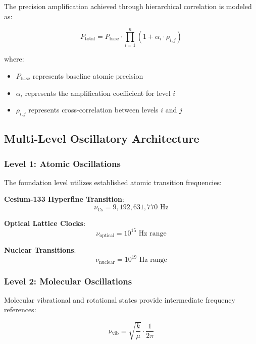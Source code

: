 \documentclass[12pt,a4paper]{article}
\begin{document}
{{{{{{{{{{{{{{The precision amplification achieved through hierarchical correlation is modeled as:

\begin{equation}
P_{\text{total}} = P_{\text{base}} \cdot \prod_{i=1}^{n} (1 + \alpha_i \cdot \rho_{i,j})
\end{equation}

where:
\begin{itemize}
\item $P_{\text{base}}$ represents baseline atomic precision
\item $\alpha_i$ represents the amplification coefficient for level $i$
\item $\rho_{i,j}$ represents cross-correlation between levels $i$ and $j$
\end{itemize}

\subsection{Multi-Level Oscillatory Architecture}

\subsubsection{Level 1: Atomic Oscillations}

The foundation level utilizes established atomic transition frequencies:

\textbf{Cesium-133 Hyperfine Transition}:
\begin{equation}
\nu_{\text{Cs}} = 9,192,631,770 \text{ Hz}
\end{equation}

\textbf{Optical Lattice Clocks}:
\begin{equation}
\nu_{\text{optical}} = 10^{15} \text{ Hz range}
\end{equation}

\textbf{Nuclear Transitions}:
\begin{equation}
\nu_{\text{nuclear}} = 10^{19} \text{ Hz range}
\end{equation}

\subsubsection{Level 2: Molecular Oscillations}

Molecular vibrational and rotational states provide intermediate frequency references:

\begin{equation}
\nu_{\text{vib}} = \sqrt{\frac{k}{\mu}} \cdot \frac{1}{2\pi}
\end{equation}

}}}}}}}}}}}}}}
\end{document}
